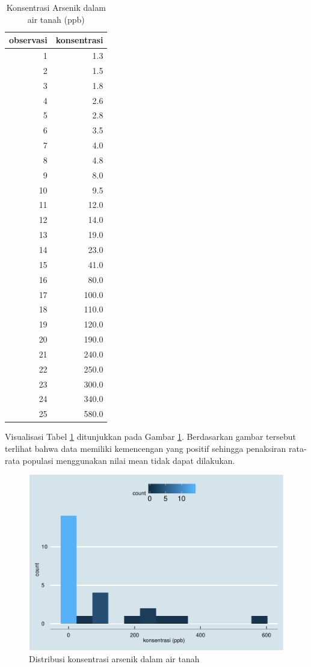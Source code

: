 \documentclass[]{book}
\begin{document}
\begin{table}[t]

\caption{\label{tab:gwardat}Konsentrasi Arsenik dalam air tanah (ppb)}
\centering
\begin{tabular}{r|r}
\hline
observasi & konsentrasi\\
\hline
1 & 1.3\\
\hline
2 & 1.5\\
\hline
3 & 1.8\\
\hline
4 & 2.6\\
\hline
5 & 2.8\\
\hline
6 & 3.5\\
\hline
7 & 4.0\\
\hline
8 & 4.8\\
\hline
9 & 8.0\\
\hline
10 & 9.5\\
\hline
11 & 12.0\\
\hline
12 & 14.0\\
\hline
13 & 19.0\\
\hline
14 & 23.0\\
\hline
15 & 41.0\\
\hline
16 & 80.0\\
\hline
17 & 100.0\\
\hline
18 & 110.0\\
\hline
19 & 120.0\\
\hline
20 & 190.0\\
\hline
21 & 240.0\\
\hline
22 & 250.0\\
\hline
23 & 300.0\\
\hline
24 & 340.0\\
\hline
25 & 580.0\\
\hline
\end{tabular}
\end{table}

Visualisasi Tabel \ref{tab:gwardat} ditunjukkan pada Gambar
\ref{fig:gwardatvis}. Berdasarkan gambar tersebut terlihat bahwa data
memiliki kemencengan yang positif sehingga penaksiran rata-rata populasi
menggunakan nilai mean tidak dapat dilakukan.

\begin{figure}

{\centering \includegraphics[width=0.7\linewidth]{EnvStat_files/figure-latex/gwardatvis-1} 

}

\caption{Distribusi konsentrasi arsenik dalam air tanah}\label{fig:gwardatvis}
\end{figure}
\end{document}
